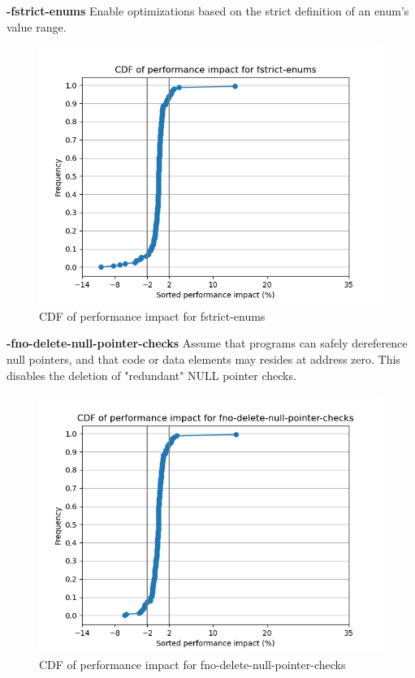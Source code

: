 \documentclass{sciposter}
\begin{document}
\begin{multicols}{3}
\textbf{-fstrict-enums} Enable optimizations based on the strict definition of
an enum's value range. \\
\begin{figure}[h!]
\centering
\includegraphics[scale=1.2]{fstrict-enums}
\caption{CDF of performance impact for fstrict-enums}
\end{figure}

\textbf{-fno-delete-null-pointer-checks} Assume that programs can safely
dereference null pointers, and that code or data elements may resides at address
zero. This disables the deletion of "redundant" NULL pointer checks.\\
\begin{figure}[h!]
\centering
\includegraphics[scale=1.2]{fno-delete-null-pointer-checks}
\caption{CDF of performance impact for fno-delete-null-pointer-checks}
\end{figure}


\end{multicols}
\end{document}
